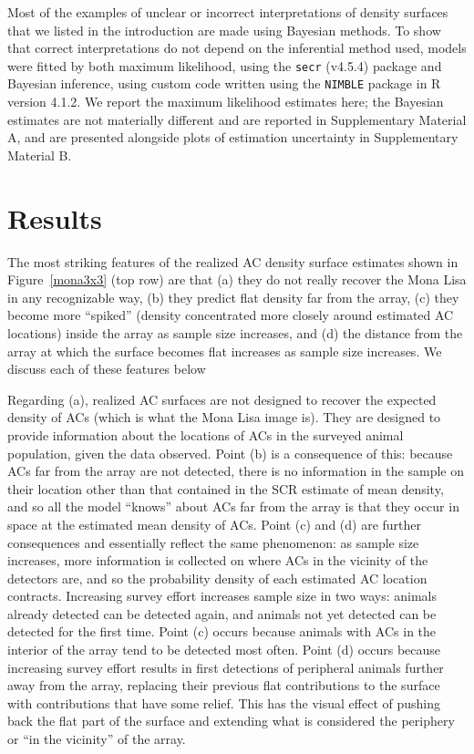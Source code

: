 \documentclass[useAMS,usenatbib,referee]{biom}
\begin{document}
Most of the examples of unclear or incorrect interpretations of density surfaces that we listed in the introduction are made using Bayesian methods. To show that correct interpretations do not depend on the inferential method used, models were fitted by both maximum likelihood, using the \texttt{secr} (v4.5.4) package \citep{secr:22} and Bayesian inference, using custom code written using the \texttt{NIMBLE} package \citep{deValpine:17, Turek:21} in R version 4.1.2. We report the maximum likelihood estimates here; the Bayesian estimates are not materially different and are reported in Supplementary Material A, and are presented alongside plots of estimation uncertainty in Supplementary Material B.

\section{Results}
The most striking features of the realized AC density surface estimates shown in Figure~\ref{mona3x3} (top row) are that (a) they do not really recover the Mona Lisa in any recognizable way, (b) they predict flat density far from the array, (c) they become more ``spiked'' (density concentrated more closely around estimated AC locations) inside the array as sample size increases, and (d) the distance from the array at which the surface becomes flat increases as sample size increases. We discuss each of these features below

Regarding (a), realized AC surfaces are not designed to recover the expected density of ACs (which is what the Mona Lisa image is). They are designed to provide information about the locations of ACs in the surveyed animal population, given the data observed. Point (b) is a consequence of this: because ACs far from the array are not detected, there is no information in the sample on their location other than that contained in the SCR estimate of mean density, and so all the model ``knows'' about ACs far from the array is that they occur in space at the estimated mean density of ACs. Point (c) and (d) are further consequences and essentially reflect the same phenomenon: as sample size increases, more information is collected on where ACs in the vicinity of the detectors are, and so the probability density of each estimated AC location contracts. Increasing survey effort increases sample size in two ways: animals already detected can be detected again, and animals not yet detected can be detected for the first time. Point (c) occurs because animals with ACs in the interior of the array tend to be detected most often. Point (d) occurs because increasing survey effort results in first detections of peripheral animals further away from the array, replacing their previous flat contributions to the surface with contributions that have some relief. This has the visual effect of pushing back the flat part of the surface and extending what is considered the periphery or ``in the vicinity'' of the array. 
\end{document}
